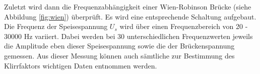 Zuletzt wird dann die Frequenzabhängigkeit einer Wien-Robinson Brücke (siehe Abbildung \ref{fig:wien})
überprüft. Es wird eine entsprechende Schaltung aufgebaut. Die Frequenz der
Speisespannung $U_s$ wird über einen Frequenzbereich von 20 - 30000 Hz variiert.
Dabei werden bei 30 unterschiedlichen Frequenzwerten jeweils die Amplitude eben dieser
Speisespannung sowie die der Brückenspannung gemessen. Aus dieser Messung können
auch sämtliche zur Bestimmung des Klirrfaktors wichtigen Daten entnommen werden.
